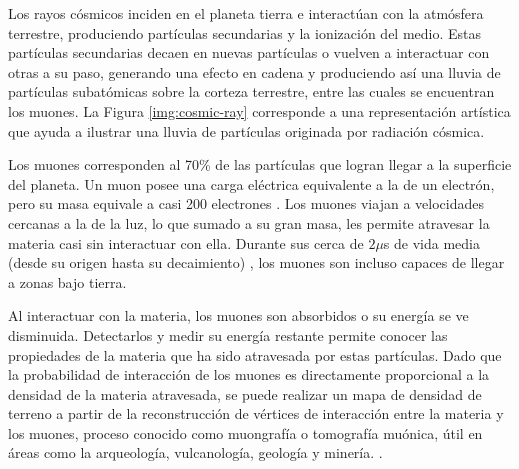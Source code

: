 	
	Los rayos cósmicos inciden en el planeta tierra e interactúan con la atmósfera terrestre, produciendo partículas secundarias y la ionización del medio. Estas partículas secundarias decaen en nuevas partículas o vuelven a interactuar con otras a su paso, generando una efecto en cadena y produciendo así una lluvia de partículas subatómicas sobre la corteza terrestre, entre las cuales se encuentran los muones. La Figura \ref{img:cosmic-ray} corresponde a una representación artística que ayuda a ilustrar una lluvia de partículas originada por radiación cósmica.
	
	Los muones corresponden al 70\% de las partículas que logran llegar a la superficie del planeta. Un muon posee una carga eléctrica equivalente a la de un electrón, pero su masa equivale a casi 200 electrones . Los muones viajan a velocidades cercanas a la de la luz, lo que sumado a su gran masa, les permite atravesar la materia casi sin interactuar con ella. Durante sus cerca de $2\mu$s de vida media \cite{Tanabashi2018ReviewPhysics} (desde su origen hasta su decaimiento) , los muones son incluso capaces de llegar a zonas bajo tierra.
	
	Al interactuar con la materia, los muones son absorbidos o su energía se ve disminuida. Detectarlos y medir su energía restante permite conocer las propiedades de la materia que ha sido atravesada por estas partículas. Dado que la probabilidad de interacción  de los muones es directamente proporcional a la densidad de la materia atravesada, se puede realizar un mapa de densidad de terreno a partir de la reconstrucción de vértices de interacción entre la materia y los muones, proceso conocido como muongrafía o tomografía muónica, útil en áreas como la arqueología, vulcanología, geología y minería. \cite{Rocca2018CosmicUs} \cite{2012HandbookImaging}.  
	
